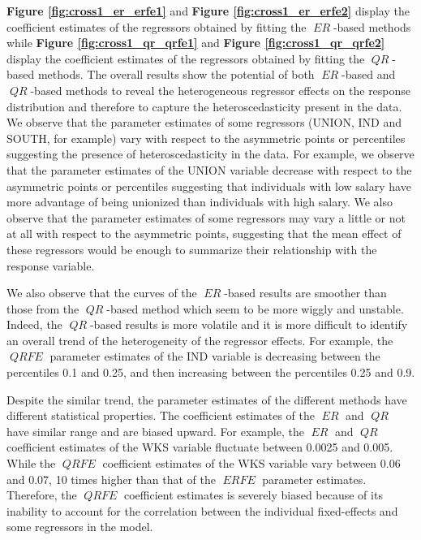 \documentclass[15pt,a4paper]{article}
\DeclareMathOperator{\ERFE}{\textit{ERFE}}
\DeclareMathOperator{\QRFE}{\textit{QRFE}}
\DeclareMathOperator{\ER}{\textit{ER}}
\DeclareMathOperator{\QR}{\textit{QR}}
\begin{document}
\textbf{Figure \ref{fig:cross1_er_erfe1}} and \textbf{Figure \ref{fig:cross1_er_erfe2}} display the coefficient estimates of the regressors
obtained by fitting the $\ER$-based methods while \textbf{Figure \ref{fig:cross1_qr_qrfe1}} and \textbf{Figure \ref{fig:cross1_qr_qrfe2}} display the coefficient estimates of the regressors obtained by fitting the $\QR$-based methods. The overall results show the potential of both $\ER$-based and $\QR$-based methods to reveal the  heterogeneous regressor effects on the response distribution and therefore to capture the heteroscedasticity present in the data. We observe that the parameter estimates of some regressors (UNION, IND and SOUTH, for example) vary with respect to the asymmetric points or percentiles suggesting the presence of heteroscedasticity in the data. For example, we observe that the parameter estimates of the UNION variable decrease with respect to the asymmetric points or percentiles suggesting that individuals with low salary have more advantage of being unionized than individuals with high salary. We also observe that the parameter estimates of some regressors may vary a little or not at all with respect to the asymmetric points, suggesting that the mean effect of these regressors would be enough to summarize their relationship with the response variable. 


We also observe that the curves of the $\ER$-based results are smoother than those from the $\QR$-based method which seem to be more wiggly and unstable. Indeed, the $\QR$-based results is more volatile and it is more difficult to identify an overall trend of the heterogeneity of the regressor effects. For example, the $\QRFE$ parameter estimates of the IND variable is decreasing between the percentiles 0.1  and 0.25, and then increasing between the percentiles 0.25 and  0.9.

Despite the similar trend, the parameter estimates of the different methods have different statistical properties. The coefficient estimates of the $\ER$ and $\QR$ have similar range and are biased upward. For example, the $\ER$ and $\QR$ coefficient estimates of the WKS variable fluctuate between 0.0025 and 0.005. While the $\QRFE$ coefficient estimates of the WKS variable vary between 0.06 and 0.07, 10 times higher than that of the $\ERFE$ parameter estimates. Therefore, the $\QRFE$ coefficient estimates is severely biased because of its inability to account for the correlation between the individual fixed-effects and some regressors in the model.   
\end{document}

